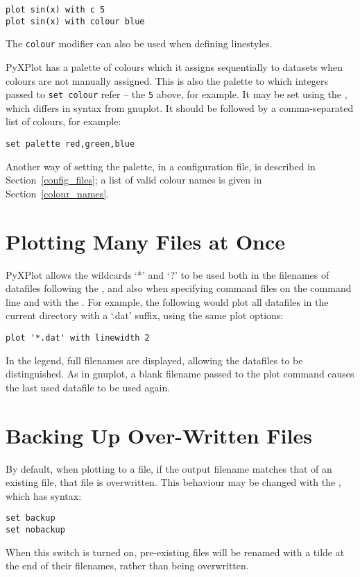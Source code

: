 \begin{verbatim}
plot sin(x) with c 5
plot sin(x) with colour blue
\end{verbatim}

\noindent The {\tt colour} modifier can also be used when defining linestyles.

 PyXPlot has a palette of colours which it
assigns sequentially to datasets when colours are not manually assigned. This
is also the palette to which integers passed to {\tt set colour} refer -- the
{\tt 5} above, for example. It may be set using the ,
which differs in syntax from gnuplot. It should be followed by a
comma-separated list of colours, for example:

\begin{verbatim}
set palette red,green,blue
\end{verbatim}

Another way of setting the palette, in a configuration file, is described in
Section~\ref{config_files}; a list of valid colour names is given in
Section~\ref{colour_names}.

\section{Plotting Many Files at Once}


PyXPlot allows the wildcards `*' and `?' to be used both in the filenames of
datafiles following the , and also when specifying command files
on the command line and with the . For example, the following
would plot all datafiles in the current directory with a `.dat' suffix, using
the same plot options:

\begin{verbatim}
plot '*.dat' with linewidth 2
\end{verbatim}

In the legend, full filenames are displayed, allowing the datafiles to be
distinguished.  As in gnuplot, a blank filename passed to the plot command
causes the last used datafile to be used again.

\section{Backing Up Over-Written Files}

\label{filebackup}

By default, when plotting to a file, if the output filename matches that of an
existing file, that file is overwritten. This behaviour may be changed with the
, which has syntax:

\begin{verbatim}
set backup
set nobackup
\end{verbatim}

When this switch is turned on, pre-existing files will be renamed with a tilde
at the end of their filenames, rather than being overwritten.

